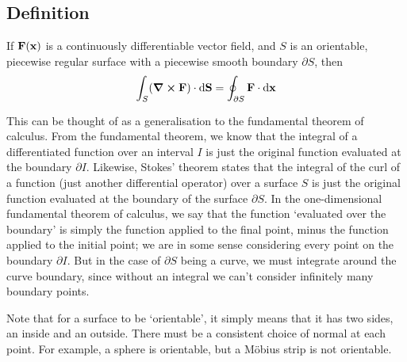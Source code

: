 \subsection{Definition}
\begin{proposition}
	If \(\vb F(\vb x)\) is a continuously differentiable vector field, and \(S\) is an orientable, piecewise regular surface with a piecewise smooth boundary \(\partial S\), then
	\[
		\int_S (\curl{\vb F}) \cdot \dd \vb S = \oint_{\partial S} \vb F\cdot \dd{\vb x}
	\]
\end{proposition}
\noindent This can be thought of as a generalisation to the fundamental theorem of calculus.
From the fundamental theorem, we know that the integral of a differentiated function over an interval \(I\) is just the original function evaluated at the boundary \(\partial I\).
Likewise, Stokes' theorem states that the integral of the curl of a function (just another differential operator) over a surface \(S\) is just the original function evaluated at the boundary of the surface \(\partial S\).
In the one-dimensional fundamental theorem of calculus, we say that the function `evaluated over the boundary' is simply the function applied to the final point, minus the function applied to the initial point; we are in some sense considering every point on the boundary \(\partial I\).
But in the case of \(\partial S\) being a curve, we must integrate around the curve boundary, since without an integral we can't consider infinitely many boundary points.

Note that for a surface to be `orientable', it simply means that it has two sides, an inside and an outside.
There must be a consistent choice of normal at each point.
For example, a sphere is orientable, but a M\"obius strip is not orientable.

